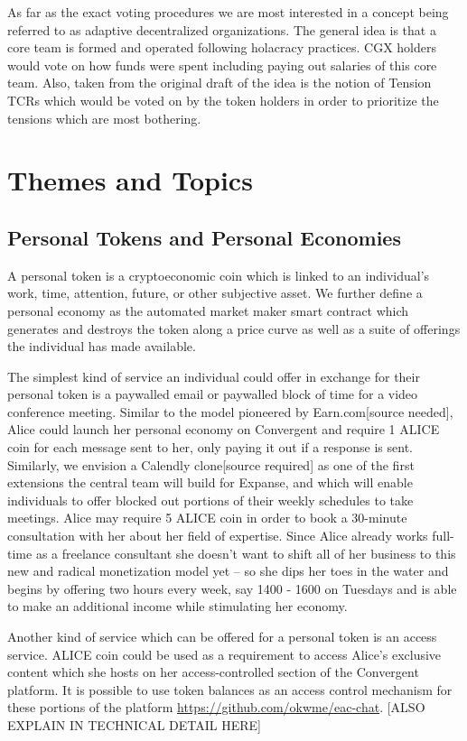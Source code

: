 \documentclass[a4paper, 10pt]{article}
\begin{document}
As far as the exact voting procedures we are most interested in a concept being referred to as adaptive decentralized organizations. The general idea is that a core team is formed and operated following holacracy practices. CGX holders would vote on how funds were spent including paying out salaries of this core team. Also, taken from the original draft of the idea is the notion of Tension TCRs which would be voted on by the token holders in order to prioritize the tensions which are most bothering.

\section{Themes and Topics}

\subsection{Personal Tokens and Personal Economies}

A personal token is a cryptoeconomic coin which is linked to an individual’s work, time, attention, future, or other subjective asset. We further define a personal economy as the automated market maker smart contract which generates and destroys the token along a price curve as well as a suite of offerings the individual has made available. 

The simplest kind of service an individual could offer in exchange for their personal token is a paywalled email or paywalled block of time for a video conference meeting. Similar to the model pioneered by Earn.com[source needed], Alice could launch her personal economy on Convergent and require 1 ALICE coin for each message sent to her, only paying it out if a response is sent. Similarly, we envision a Calendly clone[source required] as one of the first extensions the central team will build for Expanse, and which will enable individuals to offer blocked out portions of their weekly schedules to take meetings. Alice may require 5 ALICE coin in order to book a 30-minute consultation with her about her field of expertise. Since Alice already works full-time as a freelance consultant she doesn’t want to shift all of her business to this new and radical monetization model yet -- so she dips her toes in the water and begins by offering two hours every week, say 1400 - 1600 on Tuesdays and is able to make an additional income while stimulating her economy.

Another kind of service which can be offered for a personal token is an access service. ALICE coin could be used as a requirement to access Alice’s exclusive content which she hosts on her access-controlled section of the Convergent platform. It is possible to use token balances as an access control mechanism for these portions of the platform \url{https://github.com/okwme/eac-chat}. [ALSO EXPLAIN IN TECHNICAL DETAIL HERE]
\end{document}
